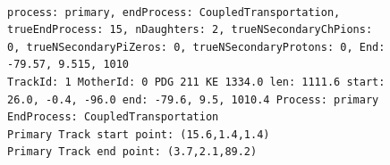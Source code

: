 \documentclass[letterpaper,12pt]{article}
\begin{document}
\begin{figure}[!hbtp]
  \begin{center}
\\
\begin{lstlisting}
process: primary, endProcess: CoupledTransportation, trueEndProcess: 15, nDaughters: 2, trueNSecondaryChPions: 0, trueNSecondaryPiZeros: 0, trueNSecondaryProtons: 0, End: -79.57, 9.515, 1010
TrackId: 1 MotherId: 0 PDG 211 KE 1334.0 len: 1111.6 start: 26.0, -0.4, -96.0 end: -79.6, 9.5, 1010.4 Process: primary EndProcess: CoupledTransportation
Primary Track start point: (15.6,1.4,1.4)
Primary Track end point: (3.7,2.1,89.2)

\end{lstlisting}
\end{center}
\end{figure}
\end{document}

